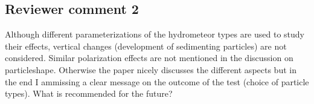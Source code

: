 %
%
%

\subsection*{Reviewer comment 2}

Although different parameterizations of the hydrometeor types are used to
study their effects, vertical changes (development of sedimenting particles)
are not considered. Similar polarization effects are not mentioned in the
discussion on particleshape. Otherwise the paper nicely discusses the different
aspects but in the end I ammissing a clear message on the outcome of the test
(choice of particle types). What is recommended for the future?

